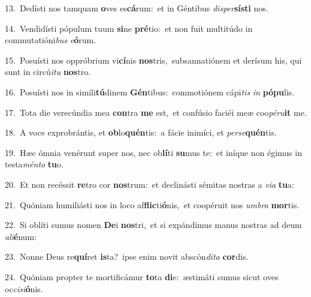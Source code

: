 {\numbfont\textcolor{\numbcolor}{13.}}~Dedísti nos tamquam \textbf{o}\-ves es\-\textbf{cá}\-rum:~\star et in Géntibus \textit{di}\-\textit{sper}\textbf{sís}\textbf{ti} nos.\par
{\numbfont\textcolor{\numbcolor}{14.}}~Vendidísti pópulum tuum \textbf{si}\-ne \textbf{pré}\-tio:~\star et non fuit multitúdo in commutatióni\textit{bus} \textit{e}\-\textbf{ó}rum.\par
{\numbfont\textcolor{\numbcolor}{15.}}~Posuísti nos oppróbrium vi\-\textbf{cí}\-nis \textbf{nos}\-tris,~\star subsannatiónem et derísum his, qui sunt in circú\-\textit{i}\-\textit{tu} \textbf{nos}\-tro.\par
{\numbfont\textcolor{\numbcolor}{16.}}~Posuísti nos in simili\-\textbf{tú}\-dinem \textbf{Gén}\-tibus:~\star commotiónem cápi\textit{tis} \textit{in} \textbf{pó}\-\textbf{pu}lis.\par
{\numbfont\textcolor{\numbcolor}{17.}}~Tota die verecúndia mea \textbf{con}\-tra \textbf{me} est,~\star et confúsio faciéi meæ coo\-\textit{pé}\-\textit{ru}\textbf{it} me.\par
{\numbfont\textcolor{\numbcolor}{18.}}~A voce exprobrántis, et \textbf{ob}\-lo\-\textbf{quén}\-tis:~\star a fácie inimíci, et \textit{per}\-\textit{se}\textbf{quén}tis.\par
{\numbfont\textcolor{\numbcolor}{19.}}~Hæc ómnia venérunt super nos, nec ob\-\textbf{lí}\-ti \textbf{su}\-mus te:~\star et iníque non égimus in testa\-\textit{mén}\-\textit{to} \textbf{tu}\-o.\par
{\numbfont\textcolor{\numbcolor}{20.}}~Et non recéssit \textbf{re}\-tro cor \textbf{nos}\-trum:~\star et declinásti sémitas nostras a \textit{vi}\-\textit{a} \textbf{tu}\-a:\par
{\numbfont\textcolor{\numbcolor}{21.}}~Quóniam humiliásti nos in loco af\-\textbf{flic}\-ti\-\textbf{ó}\-nis,~\star et coopéruit nos \textit{um}\-\textit{bra} \textbf{mor}\-tis.\par
{\numbfont\textcolor{\numbcolor}{22.}}~Si oblíti sumus nomen \textbf{De}\-i \textbf{nos}\-tri,~\star et si expándimus manus nostras ad deum \textit{a}\-\textit{li}\textbf{é}num:\par
{\numbfont\textcolor{\numbcolor}{23.}}~Nonne Deus re\-\textbf{quí}\-ret \textbf{is}\-ta?~\star ipse enim novit abscón\-\textit{di}\-\textit{ta} \textbf{cor}\-dis.\par
{\numbfont\textcolor{\numbcolor}{24.}}~Quóniam propter te mortificámur \textbf{to}\-ta \textbf{di}\-e:~\star æstimáti sumus sicut oves oc\-\textit{ci}\-\textit{si}\textbf{ó}nis.\par
